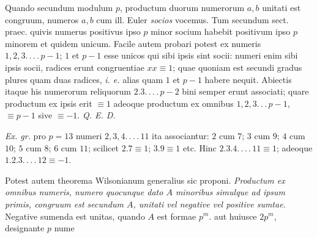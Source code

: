 
Quando secundum modulum $p$, productum duorum numerorum $a,b$ unitati est congruum, numeros $a,b$ cum ill. Euler \emph{socios} vocemus. Tum secundum sect. praec. quivis numerus positivus ipso $p$ minor socium habebit positivum ipso $p$ minorem et quidem unicum. Facile autem probari potest ex numeris $1,2,3\mathpunct{.\,.\,.\,.}\,p-1$; $1$ et $p-1$ esse unicos qui sibi ipsis sint socii: numeri enim sibi ipsis socii, radices erunt congruentiae $xx\equiv1$; quae quoniam est secundi gradus plures quam duas radices, \emph{i. e.} alias quam $1$ et $p-1$ habere nequit. Abiectis itaque his numerorum reliquorum $2.3\mathpunct{.\,.\,.\,.}\,p-2$ bini semper erunt associati; quare productum ex ipsis erit $\equiv1$ adeoque productum ex omnibus $1,2,3\mathpunct{.\,.\,.}\,p-1$, $\equiv p-1$ sive $\equiv-1$. \emph{Q. E. D.}

\emph{Ex. gr.} pro $p=13$ numeri $2,3,4\mathpunct{.\,.\,.\,.}\,11$ ita associantur: $2$ cum $7$; $3$ cum $9$; $4$ cum $10$; $5$ cum $8$; $6$ cum $11$; scilicet $2.7\equiv1$; $3.9\equiv1$ etc. Hinc $2.3.4\mathpunct{.\,.\,.\,.}\,11\equiv1$; adeoque $1.2.3\mathpunct{.\,.\,.\,.}\,12\equiv-1$.


Potest autem theorema Wilsonianum generalius sic proponi. \emph{Productum ex omnibus numeris, numero quocunque dato $A$ minoribus simulque ad ipsum primis, congruum est secundum $A$, unitati vel negative vel positive sumtae.} Negative sumenda est unitas, quando $A$ est formae $p^m$. aut huiusce $2p^m$, designante $p$ nume%
